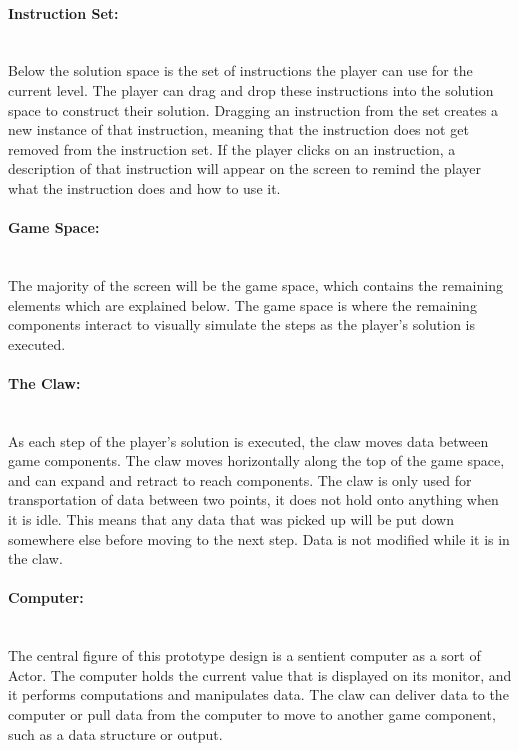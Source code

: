 \paragraph{Instruction Set:} ~\\
Below the solution space is the set of instructions the player can use for the current level. The 
player can drag and drop these instructions into the solution space to construct their solution. 
Dragging an instruction from the set creates a new instance of that instruction, meaning that the 
instruction does not get removed from the instruction set. If the player clicks on an instruction, 
a description of that instruction will appear on the screen to remind the player what the instruction 
does and how to use it.\\

\paragraph{Game Space:} ~\\
The majority of the screen will be the game space, which contains the remaining elements which 
are explained below. The game space is where the remaining components interact to visually 
simulate the steps as the player's solution is executed.\\

\paragraph{The Claw:} ~\\
As each step of the player's solution is executed, the claw moves data between game components. 
The claw moves horizontally along the top of the game space, and can expand and retract to reach 
components. The claw is only used for transportation of data between two points, it does not hold 
onto anything when it is idle. This means that any data that was picked up will be put down somewhere 
else before moving to the next step. Data is not modified while it is in the claw.\\

\paragraph{Computer:} ~\\
The central figure of this prototype design is a sentient computer as a sort of Actor. The computer holds 
the current value that is displayed on its monitor, and it performs computations and manipulates data. 
The claw can deliver data to the computer or pull data from the computer to move to another game 
component, such as a data structure or output.\\

